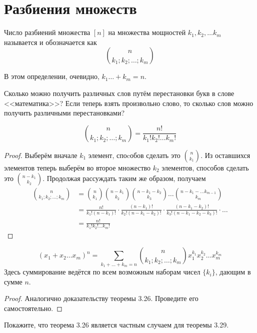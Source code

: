 \section{Разбиения множеств}

\begin{definition}
Число разбиений множества $[n]$ на множества мощностей $k_1, k_2, \ldots k_m$ называется  и обозначается как
$$n \choose k_1; k_2;\ldots; k_m$$
\end{definition}

В этом определении, очевидно, $k_1\ldots+ k_m = n$.

\begin{exercise}
Сколько можно получить различных слов путём перестановки букв в слове <<математика>>? Если теперь взять произвольно слово, то сколько слов можно получить различными перестановками?
\end{exercise}

\begin{thm}
$${n \choose k_1; k_2;\ldots; k_m} = \frac{n!}{k_1!k_2!\ldots k_m!}$$
\end{thm}
\begin{proof}
Выберём вначале $k_1$ элемент, споcобов сделать это $n\choose k_1$. Из оставшихся элементов теперь выберём во второе множество $k_2$ элементов, способов сделать это $n-k_1\choose k_2$. Продолжая рассуждать таким же образом, получаем
\begin{align*}
{n \choose k_1; k_2;\ldots; k_m} & = {n\choose k_1}{n-k_1\choose k_2}{n-k_1-k_2\choose k_3}\ldots{n-k_1-\ldots k_{m-1}\choose k_m} \\
&= \frac{n!}{k_1!(n-k_1)!}\cdot\frac{(n-k_1)!}{k_2!(n-k_1-k_2)!}\cdot\frac{(n-k_1-k_2)!}{k_3!(n-k_1-k_2-k_3)!}\cdot\ldots\\
&=\frac{n!}{k_1!k_2!\ldots k_m!}
\end{align*}
\end{proof}

\begin{thm}
$$(x_1+x_2\ldots x_m)^n = \sum_{k_1+\ldots + k_m = n}{n\choose k_1;k_2;\ldots;k_m}x_1^{k_1}x_2^{k_2}\ldots x_m^{k_m}$$
Здесь суммирование ведётся по всем возможным наборам чисел $\{k_i\}$, дающим в сумме $n$.
\end{thm}
\begin{proof}
Аналогично доказательству теоремы 3.26. Проведите его самостоятельно.
\end{proof}

\begin{exercise}
Покажите, что теорема 3.26 является частным случаем для теоремы 3.29.
\end{exercise}

